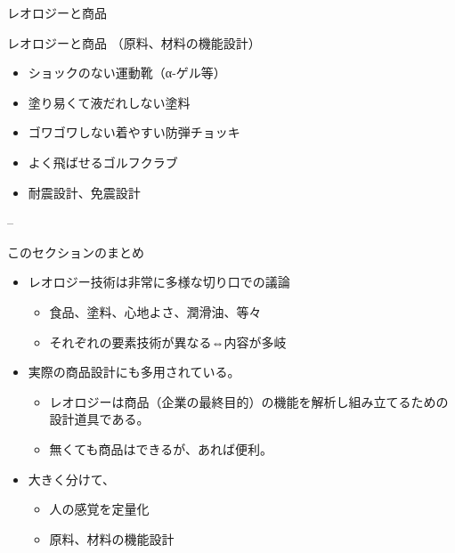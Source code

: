 \begin{frame}{レオロジーと商品}
\begin{block}{レオロジーと商品 （原料、材料の機能設計）}
\begin{itemize}
  \begin{itemize}
  
  \item
    ショックのない運動靴（α-ゲル等）
  \item
    塗り易くて液だれしない塗料
  \item
    ゴワゴワしない着やすい防弾チョッキ
  \item
    よく飛ばせるゴルフクラブ
  \item
    耐震設計、免震設計
  \end{itemize}
\end{itemize}

--

\end{block}

\end{frame}

\begin{frame}{このセクションのまとめ}

\begin{itemize}

\item
  レオロジー技術は非常に多様な切り口での議論

  \begin{itemize}
  
  \item
    食品、塗料、心地よさ、潤滑油、等々
  \item
    それぞれの要素技術が異なる⇔内容が多岐
  \end{itemize}
\item
  実際の商品設計にも多用されている。

  \begin{itemize}
  
  \item
    レオロジーは商品（企業の最終目的）の機能を解析し組み立てるための設計道具である。
  \item
    無くても商品はできるが、あれば便利。
  \end{itemize}
\item
  大きく分けて、

  \begin{itemize}
  
  \item
    人の感覚を定量化
  \item
    原料、材料の機能設計
  \end{itemize}
\end{itemize}

\end{frame}

